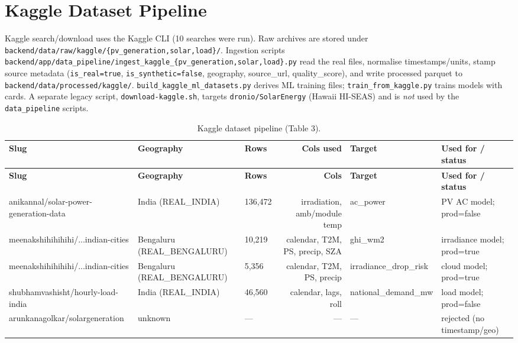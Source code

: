 \documentclass[11pt,a4paper]{article}
\newcommand{\code}[1]{\texttt{\small #1}}
\begin{document}
\section{Kaggle Dataset Pipeline}
Kaggle search/download uses the Kaggle CLI (10 searches were run). Raw archives are stored
under \code{backend/data/raw/kaggle/\{pv\_generation,solar,load\}/}. Ingestion scripts
\code{backend/app/data\_pipeline/ingest\_kaggle\_\{pv\_generation,solar,load\}.py} read the
real files, normalise timestamps/units, stamp source metadata (\code{is\_real=true},
\code{is\_synthetic=false}, geography, source\_url, quality\_score), and write processed
parquet to \code{backend/data/processed/kaggle/}. \code{build\_kaggle\_ml\_datasets.py}
derives ML training files; \code{train\_from\_kaggle.py} trains models with cards.
A separate legacy script, \code{download-kaggle.sh}, targets \code{dronio/SolarEnergy}
(Hawaii HI-SEAS) and is \emph{not} used by the \code{data\_pipeline} scripts.

\begin{footnotesize}
\begin{longtable}{@{}p{3.1cm}p{1.9cm}p{1.5cm}r p{2.0cm}p{2.6cm}@{}}
\caption{Kaggle dataset pipeline (Table 3).}\label{tab:kaggle}\\
\toprule
\textbf{Slug} & \textbf{Geography} & \textbf{Rows} & \textbf{Cols used} & \textbf{Target} & \textbf{Used for / status}\\
\midrule\endfirsthead
\toprule \textbf{Slug} & \textbf{Geography} & \textbf{Rows} & \textbf{Cols} & \textbf{Target} & \textbf{Used for / status}\\ \midrule\endhead
\bottomrule\endfoot
anikannal/solar-power-generation-data & India (REAL\_INDIA) & 136{,}472 & irradiation, amb/module temp & ac\_power & PV AC model; prod=false\\
meenakshihihihihi/...indian-cities & Bengaluru (REAL\_BENGALURU) & 10{,}219 & calendar, T2M, PS, precip, SZA & ghi\_wm2 & irradiance model; prod=true\\
meenakshihihihihi/...indian-cities & Bengaluru (REAL\_BENGALURU) & 5{,}356 & calendar, T2M, PS, precip & irradiance\_drop\_risk & cloud model; prod=true\\
shubhamvashisht/hourly-load-india & India (REAL\_INDIA) & 46{,}560 & calendar, lags, roll & national\_demand\_mw & load model; prod=false\\
arunkanagolkar/solargeneration & unknown & --- & --- & --- & rejected (no timestamp/geo)\\
\end{longtable}
\end{footnotesize}
\end{document}
